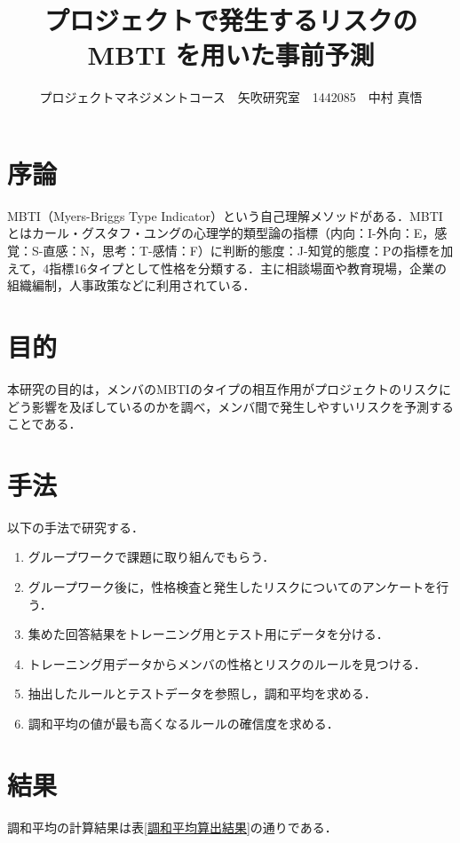\documentclass[uplatex,twocolumn,dvipdfmx]{jsarticle}
\title{\vspace{-5mm}\fontsize{14pt}{0pt}\selectfont プロジェクトで発生するリスクのMBTI を用いた事前予測}
\author{\normalsize プロジェクトマネジメントコース　矢吹研究室　1442085　中村 真悟}
\date{}
\begin{document}
\fontsize{10.5pt}{\baselineskip}\selectfont
\maketitle





\section{序論}\label{序論}
MBTI（Myers-Briggs Type Indicator）という自己理解メソッドがある．MBTIとはカール・グスタフ・ユングの心理学的類型論の指標（内向：I-外向：E，感覚：S-直感：N，思考：T-感情：F）に判断的態度：J-知覚的態度：Pの指標を加えて，4指標16タイプとして性格を分類する．主に相談場面や教育現場，企業の組織編制，人事政策などに利用されている\cite{110001230195}．

\section{目的}

本研究の目的は，メンバのMBTIのタイプの相互作用がプロジェクトのリスクにどう影響を及ぼしているのかを調べ，メンバ間で発生しやすいリスクを予測することである．
\section{手法}

以下の手法で研究する．
\begin{enumerate}
\item グループワークで課題に取り組んでもらう．
\item グループワーク後に，性格検査と発生したリスクについてのアンケートを行う．
\item 集めた回答結果をトレーニング用とテスト用にデータを分ける．
\item トレーニング用データからメンバの性格とリスクのルールを見つける．
\item 抽出したルールとテストデータを参照し，調和平均を求める．
\item 調和平均の値が最も高くなるルールの確信度を求める．
\end{enumerate}

\section{結果}

調和平均の計算結果は表\ref{調和平均算出結果}の通りである．
\end{document}
